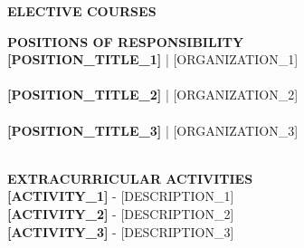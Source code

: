 \documentclass[11pt,a4paper]{article}
\begin{document}
\textbf{\large ELECTIVE COURSES}\\
[COURSE\_LIST]

\vspace{6pt}

\textbf{\large POSITIONS OF RESPONSIBILITY}\\
\textbf{[POSITION_TITLE\_1]} | [ORGANIZATION\_1]\\
[DATES\_1]\\

\textbf{[POSITION_TITLE\_2]} | [ORGANIZATION\_2]\\
[DATES\_2]\\

\textbf{[POSITION_TITLE\_3]} | [ORGANIZATION\_3]\\
[DATES\_3]\\

\vspace{6pt}

\textbf{\large EXTRACURRICULAR ACTIVITIES}\\
\textbf{[ACTIVITY\_1]} - [DESCRIPTION\_1]\\

\textbf{[ACTIVITY\_2]} - [DESCRIPTION\_2]\\

\textbf{[ACTIVITY\_3]} - [DESCRIPTION\_3]\\
\end{document}
